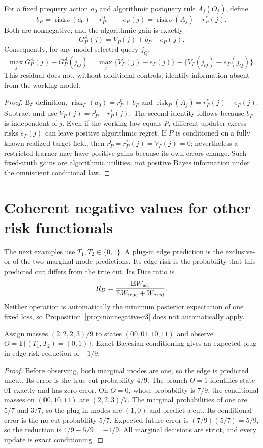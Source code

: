 \begin{proposition}
\label{prop:updater-decomposition-r3}
For a fixed prequery action $a_0$ and algorithmic postquery rule
$A_j(O_j)$, define
\[
 b_P=\operatorname{risk}_P(a_0)-r_P^0,\qquad
 e_P(j)=\operatorname{risk}_P(A_j)-r_P^*(j).
\]
Both are nonnegative, and the algorithmic gain is exactly
\[
 G_P^A(j)=V_P(j)+b_P-e_P(j).
\]
Consequently, for any model-selected query $j_Q$,
\[
 \max_jG_P^A(j)-G_P^A(j_Q)
 =\max_j\{V_P(j)-e_P(j)\}
    -\{V_P(j_Q)-e_P(j_Q)\}.
\]
This residual does not, without additional controls, identify
information absent from the working model.
\end{proposition}
\begin{proof}
By definition,
$\operatorname{risk}_P(a_0)=r_P^0+b_P$ and
$\operatorname{risk}_P(A_j)=r_P^*(j)+e_P(j)$.
Subtract and use $V_P(j)=r_P^0-r_P^*(j)$.
The second identity follows because $b_P$ is independent of $j$.
Even if the working law equals $P$, different updater excess risks
$e_P(j)$ can leave positive algorithmic regret.
If $P$ is conditioned on a fully known realized target field, then
$r_P^0=r_P^*(j)=V_P(j)=0$; nevertheless a restricted learner may have
positive gains because its own errors change. Such fixed-truth gains
are algorithmic utilities, not positive Bayes information under the
omniscient conditional law.
\end{proof}

\section{Coherent negative values for other risk functionals}

The next examples use $T_1,T_2\in\{0,1\}$.
A plug-in edge prediction is the exclusive-or of the two marginal
mode predictions. Its edge risk is the probability that this predicted
cut differs from the true cut. Its Dice ratio is
\[
 R_D=\frac{\mathbb{E}W_{\rm err}}
           {\mathbb{E}W_{\rm true}+W_{\rm pred}}.
\]
Neither operation is automatically the minimum posterior expectation
of one fixed loss, so Proposition~\ref{prop:nonnegative-r3} does not
automatically apply.

\begin{counterexample}
Assign masses $(2,2,2,3)/9$ to states $(00,01,10,11)$ and observe
$O=\mathbf{1}\{(T_1,T_2)=(0,1)\}$. Exact Bayesian conditioning gives
an expected plug-in edge-risk reduction of $-1/9$.
\end{counterexample}
\begin{proof}
Before observing, both marginal modes are one, so the edge is predicted
uncut. Its error is the true-cut probability $4/9$.
The branch $O=1$ identifies state $01$ exactly and has zero error.
On $O=0$, whose probability is $7/9$, the conditional masses on
$(00,10,11)$ are $(2,2,3)/7$. The marginal probabilities of one are
$5/7$ and $3/7$, so the plug-in modes are $(1,0)$ and predict a cut.
Its conditional error is the no-cut probability $5/7$.
Expected future error is $(7/9)(5/7)=5/9$, so the reduction is
$4/9-5/9=-1/9$. All marginal decisions are strict, and every update
is exact conditioning.
\end{proof}

